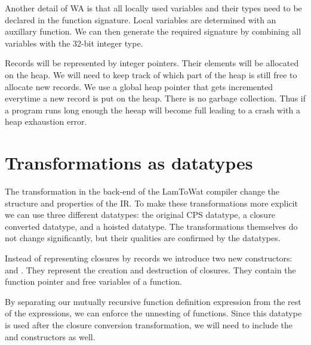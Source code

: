 Another detail of \ac{WA} is that all locally used variables and their types need to be declared in the function signature. Local variables are determined with an auxillary function. We can then generate the required signature by combining all variables with the 32-bit integer type.

Records will be represented by integer pointers. Their elements will be allocated on the heap. We will need to keep track of which part of the heap is still free to allocate new records. We use a global heap pointer that gets incremented everytime a new record is put on the heap. There is no garbage collection. Thus if a program runs long enough the heeap will become full leading to a crash with a heap exhaustion error. 

\section{\label{section:transdata}Transformations as datatypes}
The transformation in the back-end of the LamToWat compiler change the structure and properties of the \ac{IR}. To make these transformations more explicit we can use three different datatypes: the original \ac{CPS} datatype, a closure converted datatype, and a hoisted datatype. The transformations themselves do not change significantly, but their qualities are confirmed by the datatypes.

Instead of representing closures by records we introduce two new constructors:  and . They represent the creation and destruction of closures. They contain the function pointer and free variables of a function.

By separating our mutually recursive function definition expression from the rest of the expressions, we can enforce the unnesting of functions. Since this datatype is used after the closure conversion transformation, we will need to include the  and  constructors as well.

